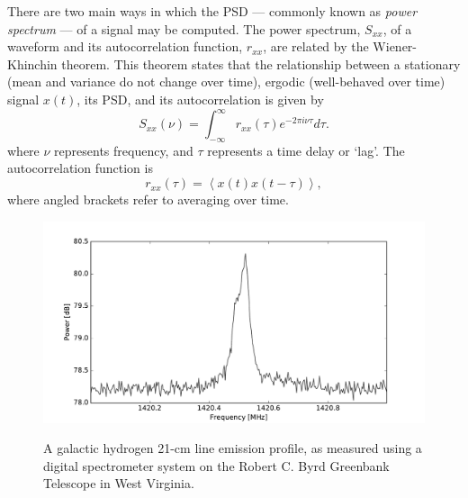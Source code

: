\documentclass{ws-rv961x669}
\begin{document}
There are two main ways in which the PSD --- commonly known as \emph{power spectrum} --- of a signal may be computed. The power spectrum, $S_{xx}$, of a waveform and its autocorrelation function,  $r_{xx}$, are related by the Wiener-Khinchin theorem. This theorem states that the relationship between a stationary (mean and variance do not change over time), ergodic (well-behaved over time) signal $x(t)$, its PSD, and its autocorrelation is given by
\begin{equation}
S_{xx}(\nu)=\int_{-\infty}^{\infty}r_{xx}(\tau)e^{-2\pi i\nu\tau}d\tau.
\label{eq:psd}
\end{equation}
where $\nu$ represents frequency, and $\tau$ represents a time delay or `lag'. The autocorrelation function is
\begin{equation}
r_{xx}(\tau)=\left\langle x(t)x(t-\tau)\right\rangle,
\end{equation}
where angled brackets refer to averaging over time. 

\begin{figure}[t]
 \centering
 \includegraphics[width=\textwidth]{./figures/hydrogen.pdf}
 \label{fig:hydrogen}
 \caption{A galactic hydrogen 21-cm line emission profile, as measured using a digital spectrometer system on the Robert C. Byrd Greenbank Telescope in West Virginia.}
\end{figure}
\end{document}
